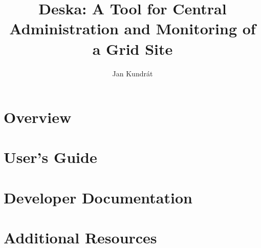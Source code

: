 \documentclass{book}
\begin{document}
\title{Deska: A Tool for Central Administration and Monitoring of a Grid Site}

\author{Jan Kundrát}

\maketitle

\setcounter{tocdepth}{3}
\tableofcontents

\part{Overview}



\part{User's Guide}






\part{Developer Documentation}









\part{Additional Resources}





\end{document}
